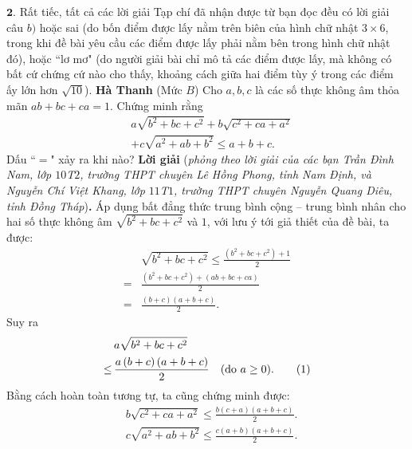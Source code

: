 \begin{multicols}{2}
	\vskip 0.05cm 
	$\pmb{2.}$ Rất tiếc, tất cả các lời giải Tạp chí đã nhận được từ bạn đọc đều có lời giải câu $b)$ hoặc sai (do bốn điểm được lấy nằm trên biên của hình chữ nhật $3\times 6$, trong khi đề bài yêu cầu các điểm được lấy phải nằm bên trong hình chữ nhật đó), hoặc ``lơ mơ" (do người giải bài chỉ mô tả các điểm được lấy, mà không có bất cứ chứng cứ nào cho thấy, khoảng cách giữa hai điểm tùy ý trong các điểm ấy lớn hơn  $\sqrt{10}$).
	\vskip 0.05cm
	\hfill	\textbf{\color{thachthuctoanhoc}Hà Thanh}
	\vskip 0.05cm
	{}
	(Mức $B$) Cho $a, b, c$ là các số thực không âm thỏa mãn $a b+b c+c a=1$. Chứng minh rằng
	\begin{align*}
		&a \sqrt{b^{2}+b c+c^{2}}+b \sqrt{c^{2}+c a+a^{2}}\\
		&+c \sqrt{a^{2}+a b+b^{2}} \le a+b+c .
	\end{align*}
	Dấu ``$=$" xảy ra khi nào?
	\vskip 0.05cm
	\textbf{\color{thachthuctoanhoc}Lời giải} (\textit{phỏng theo lời giải của các bạn Trần Đình Nam, lớp $10$T$2$, trường THPT chuyên Lê Hồng Phong, tỉnh Nam Định, và Nguyễn Chí Việt Khang, lớp $11$T$1$, trường THPT chuyên Nguyễn Quang Diêu, tỉnh Đồng Tháp})\textbf{\color{thachthuctoanhoc}.}
	\vskip 0.05cm
	Áp dụng bất đẳng thức trung bình cộng -- trung bình nhân cho hai số thực không âm  $\sqrt {{b^2} + bc + {c^2}} $ và $1$, với lưu ý tới giả thiết của đề bài, ta được:
	\begin{align*}
		&\sqrt {{b^2} + bc + {c^2}}  \le \frac{{\left( {{b^2} + bc + {c^2}} \right) + 1}}{2} \\
		= &\frac{{\left( {{b^2} + bc + {c^2}} \right) + \left( {ab + bc + ca} \right)}}{2} \\
		= &\frac{{\left( {b + c} \right)\left( {a + b + c} \right)}}{2}.
	\end{align*}
	Suy ra 
	\begin{align*}
		&a\sqrt {{b^2} + bc + {c^2}}  \\
		\le\, &\frac{{a\left( {b + c} \right)\left( {a + b + c} \right)}}{2} \quad(\text{\color{black}do } a \ge 0). \tag{$1$}
	\end{align*}
	Bằng cách hoàn toàn tương tự, ta cũng chứng minh được:
	\begin{align*}
		&b\sqrt {\!{c^2} \!+\! ca \!+\! {a^2}} \le\! \frac{{b\left( {c \!+\! a} \right)\left( {a \!+\! b \!+\! c} \right)}}{2}.\tag{$2$}\\
		&c\sqrt {\!{a^2} \!+\! ab \!+\! {b^2}} \le\! \frac{{c\left( {a \!+\! b} \right)\left(\!{a \!+\! b \!+\! c} \right)}}{2}.\tag{$3$}

\end{align*}
\end{multicols}
